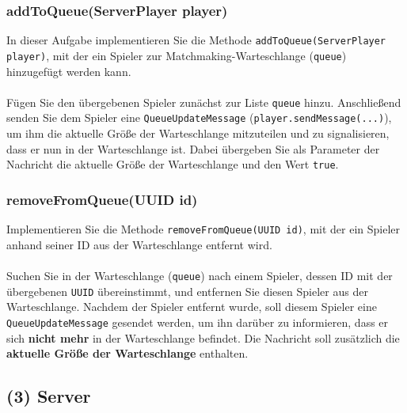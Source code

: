 \documentclass[12pt]{article}
\begin{document}
\subsubsection*{addToQueue(ServerPlayer player)}

In dieser Aufgabe implementieren Sie die Methode \texttt{addToQueue(ServerPlayer player)}, 
mit der ein Spieler zur Matchmaking-Warteschlange (\texttt{queue}) hinzugefügt werden kann.
\\ \\
Fügen Sie den übergebenen Spieler zunächst zur Liste \texttt{queue} hinzu. 
Anschließend senden Sie dem Spieler eine \texttt{QueueUpdateMessage} 
(\texttt{player.sendMessage(...)}), um ihm die aktuelle Größe der Warteschlange mitzuteilen 
und zu signalisieren, dass er nun in der Warteschlange ist. 
Dabei übergeben Sie als Parameter der Nachricht die aktuelle Größe der Warteschlange und den Wert \texttt{true}.

\subsubsection*{removeFromQueue(UUID id)}

Implementieren Sie die Methode \texttt{removeFromQueue(UUID id)}, 
mit der ein Spieler anhand seiner ID aus der Warteschlange entfernt wird.
\\ \\
Suchen Sie in der Warteschlange (\texttt{queue}) nach einem Spieler, dessen ID mit der übergebenen \texttt{UUID} übereinstimmt, 
und entfernen Sie diesen Spieler aus der Warteschlange. 
Nachdem der Spieler entfernt wurde, soll diesem Spieler eine \texttt{QueueUpdateMessage} gesendet werden, 
um ihn darüber zu informieren, dass er sich \textbf{nicht mehr} in der Warteschlange befindet. 
Die Nachricht soll zusätzlich die \textbf{aktuelle Größe der Warteschlange} enthalten.

\subsection*{(3) Server}
\end{document}
